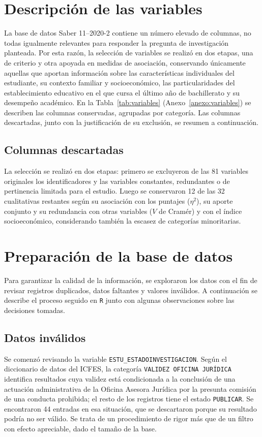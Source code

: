 \documentclass[12pt]{article}
\newcommand{\corr}[1]{\textcolor{azulcorr}{#1}}
\newenvironment{correccion}{\par\color{azulcorr}}{\par}
\begin{document}
\section{Descripción de las variables}

La base de datos Saber 11--2020-2 contiene un número elevado de columnas, no todas
igualmente relevantes para responder la pregunta de investigación planteada. Por esta
razón, la selección de variables se realizó \corr{en dos etapas, una de criterio y otra
apoyada en medidas de asociación}, conservando únicamente aquellas que aportan información sobre
las características individuales del estudiante, su contexto familiar y socioeconómico, las particularidades
del establecimiento educativo en el que cursa el último año de bachillerato y su desempeño académico. En la Tabla~\ref{tab:variables}
\corr{(Anexo~\ref{anexo:variables})} se describen las columnas conservadas, agrupadas por categoría.
Las columnas descartadas, junto con la justificación de su exclusión, se \corr{resumen} a continuación.

\subsection{Columnas descartadas}

\begin{correccion}
La selección se realizó en dos etapas: primero se excluyeron de las 81 variables
originales los identificadores y las variables constantes, redundantes o de pertinencia
limitada para el estudio. Luego se conservaron 12 de las 32 cualitativas restantes según
su asociación con los puntajes ($\eta^2$), su aporte conjunto y su redundancia con otras
variables ($V$ de Cramér) y con el índice socioeconómico, considerando también la escasez
de categorías minoritarias.
\end{correccion}

\section{Preparación de la base de datos}
Para garantizar la calidad de la información, se exploraron los datos con el fin de
revisar registros duplicados, datos faltantes y valores inválidos. A continuación se
describe el proceso seguido en \texttt{R} junto con algunas observaciones sobre las decisiones tomadas.

\subsection{Datos inválidos}
Se comenzó revisando la variable \texttt{ESTU\_ESTADOINVESTIGACION}. \corr{Según el
diccionario de datos del ICFES, la categoría \texttt{VALIDEZ OFICINA JURÍDICA} identifica
resultados cuya validez está condicionada a la conclusión de una actuación administrativa
de la Oficina Asesora Jurídica por la presunta comisión de una conducta prohibida; el resto
de los registros tiene el estado \texttt{PUBLICAR}. Se encontraron 44 entradas en esa
situación, que se descartaron porque su resultado podría no ser válido.} Se trata de un
procedimiento de rigor más que de un filtro con efecto apreciable, dado el tamaño de la base.
\end{document}
